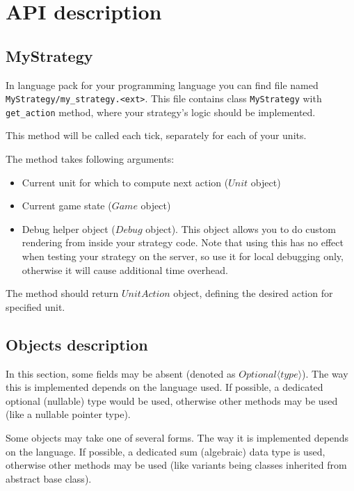 \chapter{API description}

\section{MyStrategy}

In language pack for your programming language you can find file named \texttt{MyStrategy/my\_strategy.<ext>}.
This file contains class \texttt{MyStrategy} with \texttt{get\_action} method, where your strategy's logic should be implemented.

This method will be called each tick, separately for each of your units.

The method takes following arguments:

\begin{itemize}
    \item Current unit for which to compute next action ($Unit$ object)
    \item Current game state ($Game$ object)
    \item Debug helper object ($Debug$ object). This object allows you to do custom rendering from inside your strategy code.
        Note that using this has no effect when testing your strategy on the server,
        so use it for local debugging only, otherwise it will cause additional time overhead.
\end{itemize}

The method should return $UnitAction$ object, defining the desired action for specified unit.

\section{Objects description}

In this section, some fields may be absent (denoted as $Optional \langle type \rangle$).
The way this is implemented depends on the language used.
If possible, a dedicated optional (nullable) type would be used,
otherwise other methods may be used (like a nullable pointer type).

Some objects may take one of several forms. The way it is implemented depends on the language.
If possible, a dedicated sum (algebraic) data type is used,
otherwise other methods may be used (like variants being classes inherited from abstract base class).

